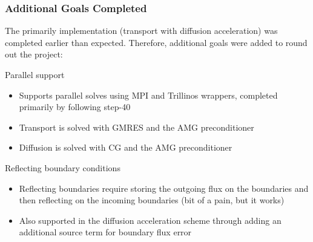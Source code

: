 \documentclass[xcolor={usenames,dvipsnames,svgnames,table}, 10pt]{beamer}
\begin{document}
\begin{frame}\frametitle{Additional Goals Completed}
	The primarily implementation (transport with diffusion acceleration) was completed earlier than expected. Therefore, additional goals were added to round out the project:
	\vfill
	\begin{block}{Parallel support}
		\begin{itemize}
			\setlength\itemsep{0.2em}
			\item Supports parallel solves using MPI and Trillinos wrappers, completed primarily by following step-40
			\item Transport is solved with GMRES and the AMG preconditioner
			\item Diffusion is solved with CG and the AMG preconditioner
		\end{itemize}
	\end{block}
	\vfill
	\begin{block}{Reflecting boundary conditions}
		\begin{itemize}
			\setlength\itemsep{0.2em}
			\item Reflecting boundaries require storing the outgoing flux on the boundaries and then reflecting on the incoming boundaries (bit of a pain, but it works)
			\item Also supported in the diffusion acceleration scheme through adding an additional source term for boundary flux error
		\end{itemize}
	\end{block}
\end{frame}

\end{document}
